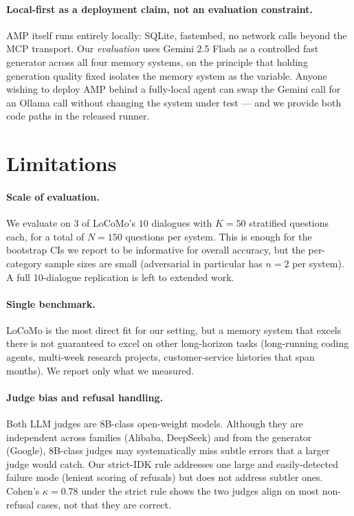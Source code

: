 \paragraph{Local-first as a deployment claim, not an evaluation constraint.} AMP itself runs entirely locally: SQLite, fastembed, no network calls beyond the MCP transport. Our \emph{evaluation} uses Gemini 2.5 Flash as a controlled fast generator across all four memory systems, on the principle that holding generation quality fixed isolates the memory system as the variable. Anyone wishing to deploy AMP behind a fully-local agent can swap the Gemini call for an Ollama call without changing the system under test --- and we provide both code paths in the released runner.

\section{Limitations}
\label{sec:limitations}

\paragraph{Scale of evaluation.} We evaluate on $3$ of LoCoMo's $10$ dialogues with $K = 50$ stratified questions each, for a total of $N = 150$ questions per system. This is enough for the bootstrap CIs we report to be informative for overall accuracy, but the per-category sample sizes are small (adversarial in particular has $n = 2$ per system). A full 10-dialogue replication is left to extended work.

\paragraph{Single benchmark.} LoCoMo is the most direct fit for our setting, but a memory system that excels there is not guaranteed to excel on other long-horizon tasks (long-running coding agents, multi-week research projects, customer-service histories that span months). We report only what we measured.

\paragraph{Judge bias and refusal handling.} Both LLM judges are 8B-class open-weight models. Although they are independent across families (Alibaba, DeepSeek) and from the generator (Google), 8B-class judges may systematically miss subtle errors that a larger judge would catch. Our strict-IDK rule addresses one large and easily-detected failure mode (lenient scoring of refusals) but does not address subtler ones. Cohen's $\kappa = 0.78$ under the strict rule shows the two judges align on most non-refusal cases, not that they are correct.

